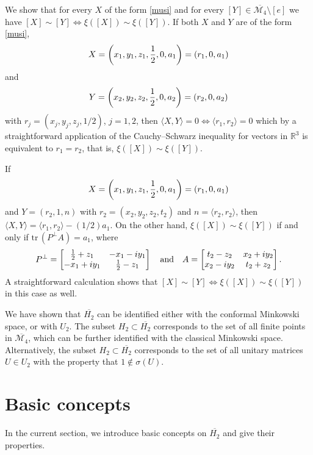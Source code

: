 \documentclass[10pt]{amsart}
\theoremstyle{definition}
\theoremstyle{remark}
\numberwithin{subsection}{section}
\numberwithin{equation}{section}
\newcommand\oH{{\overline{H_2}}}
\begin{document}
We show that for every $X$ of the form \eqref{musi} and for every $[Y] \in \overline{ \mathcal{M}_4 }\setminus [e]$ we have $[X] \sim [Y] \iff \xi ([X]) \sim \xi ([Y])$.
If both $X$ and $Y$ are of the form \eqref{musi},
\[
X =\left(x_1,y_1,z_1, {1 \over 2}, 0 , a_1 \right) = (r_1, 0, a_1) 
\]
and 
\[
Y =\left(x_2,y_2,z_2, {1 \over 2}, 0 , a_2 \right) = (r_2, 0, a_2)
\]
with $r_j = \left( x_j, y_j , z_j , 1/2 \right)$, $j=1,2$,
then $\langle X , Y \rangle = 0 \iff \langle r_1 , r_2 \rangle =0$ which by a straightforward application of the Cauchy--Schwarz inequality for vectors in $\mathbb{R}^3$ is equivalent to $r_1 = r_2$, that is, $\xi ([X]) \sim \xi ([Y])$.

If
\[
X =\left(x_1,y_1,z_1, {1 \over 2}, 0 , a_1 \right) = (r_1, 0, a_1)
\]
and $Y= (r_2, 1, n)$ with $r_2 = (x_2 , y_2, z_2 , t_2)$ and $n= \langle r_2 , r_2 \rangle$, then
$\langle X, Y \rangle = \langle r_1 , r_2 \rangle - (1/2)a_1$.
On the other hand, $\xi ([X]) \sim \xi ([Y])$ if and only if $\mathrm{tr}\, (P^\perp A) = a_1$, where
\[
P^\perp = \left[ \begin{matrix}  {1 \over 2}  + z_1 & -x_1 -iy_1 \cr -x_1+ iy_1 & {1 \over 2} - z_1 \cr\end{matrix} \right] \ \ \ \text{and} \ \ \ 
A=  \left[ \begin{matrix}  t_2 -z_2 & x_2 +iy_2 \cr x_2 -iy_2  & t_2 +z_2 \cr\end{matrix} \right].
\]
A straightforward calculation shows that $[X] \sim [Y] \iff \xi ([X]) \sim \xi ([Y])$ in  this case as well.

We have shown that $\oH$ can be identified either with the conformal Minkowski space, or with $U_2$. 
The subset $H_2 \subset \oH$ corresponds to the set of all finite points in $\overline{ \mathcal{M}_4 }$, which can be further identified with the classical Minkowski space. Alternatively, the
 subset $H_2 \subset \oH$ corresponds to the set of all unitary matrices $U \in U_2$ with the property that $1 \not\in \sigma (U)$.









\section{Basic concepts}\label{prelim}
In the current section, we introduce basic concepts on $\oH$ and give their properties. 
\end{document}
